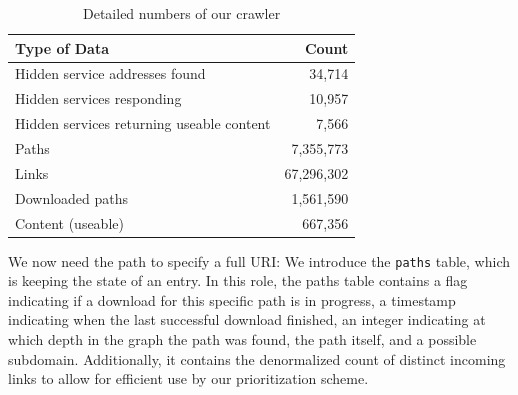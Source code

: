 \iflncs
  \begin{table}
    \vspace{-2pt}
    \begin{tabular}{l|r}
    \hline
    \textbf{Type of Data}           & \textbf{Count} \\
    \hline
    \hline
    Hidden service addresses found      & 34,714                                    \\
    \hline
    Hidden services responding                & 10,957                      \\
    \hline
    Hidden services returning useable content & 7,566                      \\
    \hline
    Paths                           & 7,355,773                   \\
    \hline
    Links                           & 67,296,302                \\
    \hline
    Downloaded paths                & 1,561,590                 \\
    \hline
    Content (useable)               & 667,356         \\
    \hline
    \end{tabular}
    \caption{Detailed numbers of our crawler}
    \label{table:scrapMetrics}
  \end{table}
\fi

We now need the path to specify a full URI: We introduce the \texttt{paths} table, which is keeping the state of an entry. In this role, the paths table contains a flag indicating if a download for this specific path is in progress, a timestamp indicating when the last successful download finished, an integer indicating at which depth in the graph the path was found, the path itself, and a possible subdomain. Additionally, it contains the denormalized count of distinct incoming links to allow for efficient use by our prioritization scheme.


